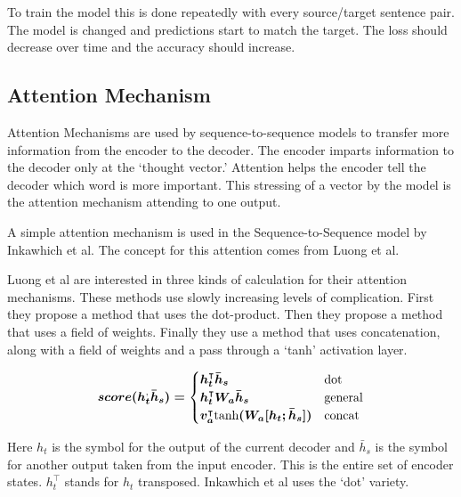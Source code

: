 To train the model this is done repeatedly with every source/target sentence pair. The model is changed and predictions start to match the target. The loss should decrease over time and the accuracy should increase.



\subsection{Attention Mechanism}

\label{section-gru-attention}

Attention Mechanisms are used by sequence-to-sequence models to transfer more information from the encoder to the decoder. The encoder imparts information to the decoder only at the `thought vector.' Attention helps the encoder tell the decoder which word is more important. This stressing of a vector by the model is the attention mechanism attending to one output.

A simple attention mechanism is used in the Sequence-to-Sequence model by Inkawhich et al. \cite{2018Inkawhich} The concept for this attention comes from Luong et al. \cite{DBLP:journals/corr/LuongPM15}

Luong et al \cite{DBLP:journals/corr/LuongPM15} are interested in three kinds of calculation for their attention mechanisms. These methods use slowly increasing levels of complication. First they propose a method that uses the dot-product. Then they propose a method that uses a field of weights. Finally they use a method that uses concatenation, along with a field of weights and a pass through a `tanh' activation layer.

$$
\boldmath
score(h_t^ \text{,} \bar{h}_s) =
\begin{cases}
    h_t^\intercal \bar{h}_s & \text{dot} \\
	h_t^\intercal W_a \bar{h}_s & \text{general} \\
	v_a^\intercal \text{tanh}(W_a [h_t ; \bar{h}_s] ) & \text{concat}
\end{cases}
\unboldmath
$$

Here $h_t$ is the symbol for the output of the current decoder and $\bar{h}_s $ is the symbol for another output taken from the input encoder. This is the entire set of encoder states. $h_t^\intercal$ stands for $h_t$ transposed. Inkawhich et al \cite{2018Inkawhich} uses the `dot' variety.

